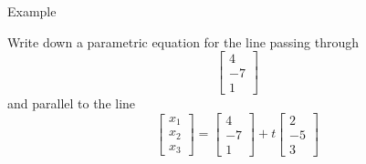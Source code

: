 \documentclass{beamer}
\begin{document}
\begin{frame}{Example}
   \begin{example}
    Write down a parametric equation for the line passing through
    \begin{equation*}
      \left[
	\begin{array}{c}
          4\\
          -7\\
          1
	\end{array}
      \right]
    \end{equation*}
    and parallel to the line
    \begin{equation*}
      \left[
	\begin{array}{c}
          x_1\\
          x_2\\
          x_3
	\end{array}
      \right] = \left[
	\begin{array}{c}
          4\\
          -7\\
          1
	\end{array}
      \right]+t \left[
	\begin{array}{c}
          2\\
          -5\\
          3
	\end{array}
      \right]
    \end{equation*}
  \end{example}
\end{frame}
\end{document}
